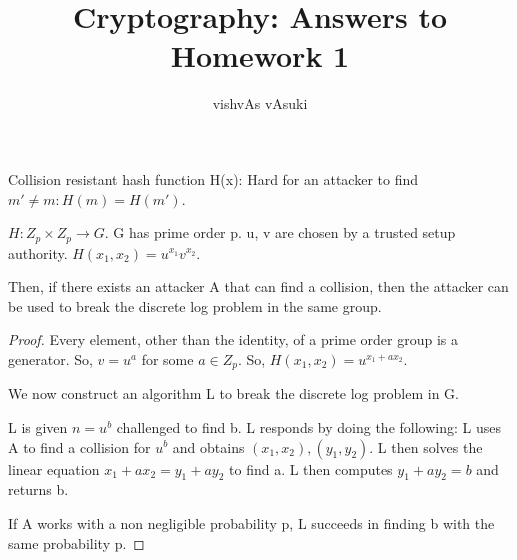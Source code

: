 \documentclass[10pt]{amsart}
\title{Cryptography: Answers to Homework 1}
\author{vishvAs vAsuki}
\begin{document}
\maketitle

\section{}
\begin{rem}
Collision resistant hash function H(x): Hard for an attacker to find $m' \neq m: H(m) = H(m')$.
\end{rem}

\begin{thm}
$H: Z_{p} \times Z_{p} \to G$. G has prime order p. u, v are chosen by a trusted setup authority. $H(x_{1}, x_{2}) = u^{x_{1}}v^{x_{2}}$.

Then, if there exists an attacker A that can find a collision, then the attacker can be used to break the discrete log problem in the same group.
\end{thm}
\begin{proof}
Every element, other than the identity, of a prime order group is a generator. So, $v = u^{a}$ for some $a\in Z_{p}$. So, $H(x_{1}, x_{2}) = u^{x_{1} + ax_{2}}$.

We now construct an algorithm L to break the discrete log problem in G.

L is given $n = u^{b}$ challenged to find b. L responds by doing the following: L uses A to find a collision for $u^{b}$ and obtains $(x_{1}, x_{2}), (y_{1}, y_{2})$. L then solves the linear equation $x_{1} + a x_{2} = y_{1} + a y_{2}$ to find a. L then computes $y_{1} + ay_{2} = b$ and returns b.

If A works with a non negligible probability p, L succeeds in finding b with the same probability p.
\end{proof}
\end{document}
